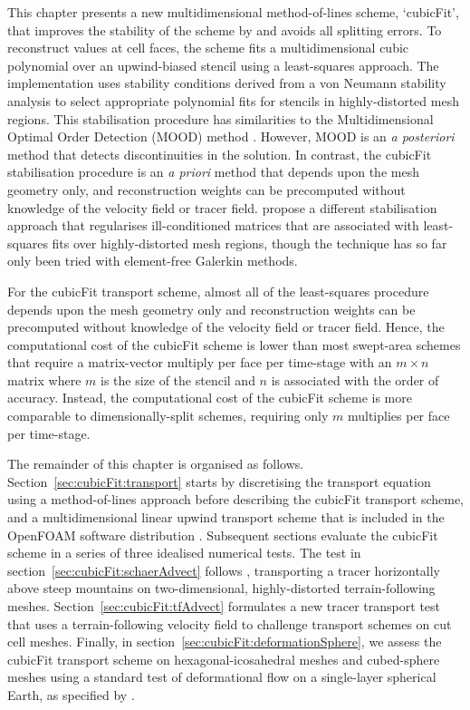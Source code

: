 This chapter presents a new multidimensional method-of-lines scheme, `cubicFit', that improves the stability of the scheme by \citet{weller-shahrokhi2014} and avoids all splitting errors.  To reconstruct values at cell faces, the scheme fits a multidimensional cubic polynomial over an upwind-biased stencil using a least-squares approach.
The implementation uses stability conditions derived from a von Neumann stability analysis to select appropriate polynomial fits for stencils in highly-distorted mesh regions.
This stabilisation procedure has similarities to the Multidimensional Optimal Order Detection (MOOD) method \citep{clain2011,diot2013}.
However, MOOD is an \textit{a posteriori} method that detects discontinuities in the solution.  In contrast, the cubicFit stabilisation procedure is an \textit{a priori} method that depends upon the mesh geometry only, and reconstruction weights can be precomputed without knowledge of the velocity field or tracer field.
\citet{wang2018} propose a different stabilisation approach that regularises ill-conditioned matrices that are associated with least-squares fits over highly-distorted mesh regions, though the technique has so far only been tried with element-free Galerkin methods.

For the cubicFit transport scheme, almost all of the least-squares procedure depends upon the mesh geometry only and reconstruction weights can be precomputed without knowledge of the velocity field or tracer field.
Hence, the computational cost of the cubicFit scheme is lower than most swept-area schemes that require a matrix-vector multiply per face per time-stage with an $m \times n$ matrix where $m$ is the size of the stencil and $n$ is associated with the order of accuracy.
Instead, the computational cost of the cubicFit scheme is more comparable to dimensionally-split schemes, requiring only $m$ multiplies per face per time-stage.

The remainder of this chapter is organised as follows.
Section~\ref{sec:cubicFit:transport} starts by discretising the transport equation using a method-of-lines approach before describing the cubicFit transport scheme, and a multidimensional linear upwind transport scheme that is included in the OpenFOAM software distribution \citep{openfoam-numerics}.
Subsequent sections evaluate the cubicFit scheme in a series of three idealised numerical tests.
The test in section~\ref{sec:cubicFit:schaerAdvect} follows \citet{schaer2002}, transporting a tracer horizontally above steep mountains on two-dimensional, highly-distorted terrain-following meshes.
Section~\ref{sec:cubicFit:tfAdvect} formulates a new tracer transport test that uses a terrain-following velocity field to challenge transport schemes on cut cell meshes.
Finally, in section~\ref{sec:cubicFit:deformationSphere}, we assess the cubicFit transport scheme on hexagonal-icosahedral meshes and cubed-sphere meshes using a standard test of deformational flow on a single-layer spherical Earth, as specified by \citet{lauritzen2012}.








